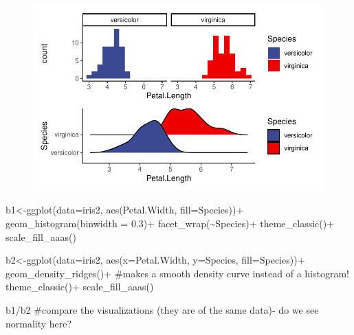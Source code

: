 \documentclass[
  letterpaper,
  DIV=11,
  numbers=noendperiod]{scrartcl}
\newenvironment{Shaded}{\begin{snugshade}}{\end{snugshade}}
\newcommand{\AttributeTok}[1]{\textcolor[rgb]{0.40,0.45,0.13}{#1}}
\newcommand{\CommentTok}[1]{\textcolor[rgb]{0.37,0.37,0.37}{#1}}
\newcommand{\FloatTok}[1]{\textcolor[rgb]{0.68,0.00,0.00}{#1}}
\newcommand{\FunctionTok}[1]{\textcolor[rgb]{0.28,0.35,0.67}{#1}}
\newcommand{\NormalTok}[1]{\textcolor[rgb]{0.00,0.23,0.31}{#1}}
\newcommand{\OtherTok}[1]{\textcolor[rgb]{0.00,0.23,0.31}{#1}}
\newcommand{\SpecialCharTok}[1]{\textcolor[rgb]{0.37,0.37,0.37}{#1}}
\begin{document}
\begin{figure}[H]

{\centering \includegraphics{t_test_files/figure-pdf/unnamed-chunk-5-1.pdf}

}

\end{figure}

\begin{Shaded}
\begin{Highlighting}[]
\NormalTok{b1}\OtherTok{\textless{}{-}}\FunctionTok{ggplot}\NormalTok{(}\AttributeTok{data=}\NormalTok{iris2, }\FunctionTok{aes}\NormalTok{(Petal.Width, }\AttributeTok{fill=}\NormalTok{Species))}\SpecialCharTok{+}
  \FunctionTok{geom\_histogram}\NormalTok{(}\AttributeTok{binwidth =} \FloatTok{0.3}\NormalTok{)}\SpecialCharTok{+} 
  \FunctionTok{facet\_wrap}\NormalTok{(}\SpecialCharTok{\textasciitilde{}}\NormalTok{Species)}\SpecialCharTok{+}
  \FunctionTok{theme\_classic}\NormalTok{()}\SpecialCharTok{+}
  \FunctionTok{scale\_fill\_aaas}\NormalTok{()}

\NormalTok{b2}\OtherTok{\textless{}{-}}\FunctionTok{ggplot}\NormalTok{(}\AttributeTok{data=}\NormalTok{iris2, }\FunctionTok{aes}\NormalTok{(}\AttributeTok{x=}\NormalTok{Petal.Width, }\AttributeTok{y=}\NormalTok{Species, }\AttributeTok{fill=}\NormalTok{Species))}\SpecialCharTok{+}
  \FunctionTok{geom\_density\_ridges}\NormalTok{()}\SpecialCharTok{+} \CommentTok{\#makes a smooth density curve instead of a histogram!}
  \FunctionTok{theme\_classic}\NormalTok{()}\SpecialCharTok{+}
  \FunctionTok{scale\_fill\_aaas}\NormalTok{()}

\NormalTok{b1}\SpecialCharTok{/}\NormalTok{b2 }\CommentTok{\#compare the visualizations (they are of the same data){-} do we see normality here?}
\end{Highlighting}
\end{Shaded}
\end{document}
